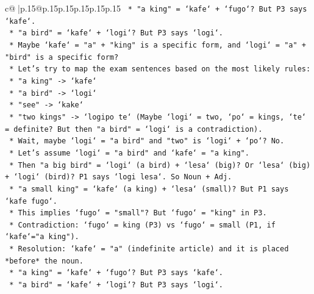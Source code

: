 \documentclass{article}
\begin{document}
{\begin{supertabular}{c@{$\;$}|p{.15\linewidth}@{}p{.15\linewidth}p{.15\linewidth}p{.15\linewidth}p{.15\linewidth}p{.15\linewidth}}
{{{\texttt{                                    *   "a king" = `kafe` + `fugo`? But P3 says `kafe`.} \\
\texttt{                                    *   "a bird" = `kafe` + `logi`? But P3 says `logi`.} \\
\texttt{                                *   Maybe `kafe` = "a" + "king" is a specific form, and `logi` = "a" + "bird" is a specific form?} \\
\texttt{                                *   Let's try to map the exam sentences based on the most likely rules:} \\
\texttt{                                    *   "a king" {-}> `kafe`} \\
\texttt{                                    *   "a bird" {-}> `logi`} \\
\texttt{                                    *   "see" {-}> `kake`} \\
\texttt{                                    *   "two kings" {-}> `logipo te` (Maybe `logi` = two, `po` = kings, `te` = definite? But then "a bird" = `logi` is a contradiction).} \\
\texttt{                                    *   Wait, maybe `logi` = "a bird" and "two" is `logi` + `po`? No.} \\
\texttt{                                    *   Let's assume `logi` = "a bird" and `kafe` = "a king".} \\
\texttt{                                    *   Then "a big bird" = `logi` (a bird) + `lesa` (big)? Or `lesa` (big) + `logi` (bird)? P1 says `logi lesa`. So Noun + Adj.} \\
\texttt{                                    *   "a small king" = `kafe` (a king) + `lesa` (small)? But P1 says `kafe fugo`.} \\
\texttt{                                    *   This implies `fugo` = "small"? But `fugo` = "king" in P3.} \\
\texttt{                                    *   Contradiction: `fugo` = king (P3) vs `fugo` = small (P1, if `kafe`="a king").} \\
\texttt{                                    *   Resolution: `kafe` = "a" (indefinite article) and it is placed *before* the noun.} \\
\texttt{                                        *   "a king" = `kafe` + `fugo`? But P3 says `kafe`.} \\
\texttt{                                        *   "a bird" = `kafe` + `logi`? But P3 says `logi`.} \\
}}}
\end{supertabular}}
\end{document}
